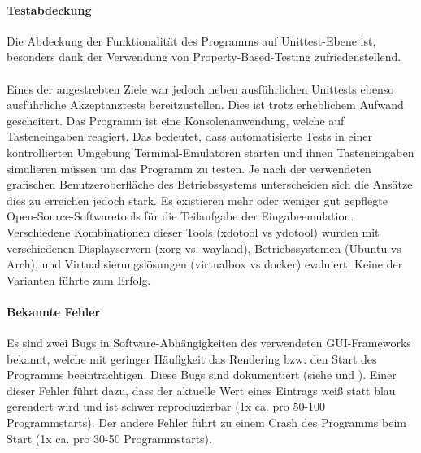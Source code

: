 \paragraph{Testabdeckung}
Die Abdeckung der Funktionalität des Programms auf Unittest-Ebene ist, besonders
dank der Verwendung von \gls{Property-Based-Testing} \cite{property-based-testing}
zufriedenstellend.

\paragraph{}
Eines der angestrebten Ziele war jedoch neben ausführlichen Unittests ebenso ausführliche
Akzeptanztests bereitzustellen. Dies ist trotz erheblichem Aufwand gescheitert.
Das Programm ist eine Konsolenanwendung, welche auf Tasteneingaben reagiert. Das
bedeutet, dass automatisierte Tests in einer kontrollierten Umgebung Terminal-Emulatoren
starten und ihnen Tasteneingaben simulieren müssen um das Programm zu testen. Je nach
der verwendeten grafischen Benutzeroberfläche des Betriebssystems unterscheiden sich
die Ansätze dies zu erreichen jedoch stark. Es existieren mehr oder weniger gut
gepflegte Open-Source-Softwaretools für die Teilaufgabe der Eingabeemulation. Verschiedene
Kombinationen dieser Tools (xdotool vs ydotool) wurden mit verschiedenen Displayservern
(xorg vs. wayland), Betriebssystemen (Ubuntu vs Arch), und Virtualisierungslösungen
(virtualbox vs docker) evaluiert. Keine der Varianten führte zum Erfolg.

\paragraph{Bekannte Fehler}
Es sind zwei Bugs in Software-Abhängigkeiten des verwendeten \gls{GUI}-Frameworks
bekannt, welche mit geringer Häufigkeit das \gls{Rendering} bzw. den Start des Programms
beeinträchtigen. Diese Bugs sind dokumentiert (siehe \cite{bug-vty-startup-crash} und
\cite{bug-vty-terminal-capabilities}). Einer dieser Fehler führt dazu, dass der
aktuelle Wert eines Eintrags weiß statt blau gerendert wird und ist schwer
reproduzierbar (1x ca. pro 50-100 Programmstarts). Der andere Fehler führt zu
einem Crash des Programms beim Start (1x ca. pro 30-50 Programmstarts).
